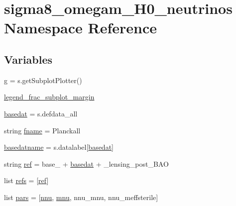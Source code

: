 \hypertarget{namespacesigma8__omegam__H0__neutrinos}{}\section{sigma8\+\_\+omegam\+\_\+\+H0\+\_\+neutrinos Namespace Reference}
\label{namespacesigma8__omegam__H0__neutrinos}
\subsection*{Variables}
\begin{DoxyCompactItemize}
\item 
\mbox{\hyperlink{namespacesigma8__omegam__H0__neutrinos_abdfd6f9ab8792b17acedacb69a00eb6a}{g}} = s.\+get\+Subplot\+Plotter()
\item 
\mbox{\hyperlink{namespacesigma8__omegam__H0__neutrinos_a851d0bb1a16b354468ede7ba521212b9}{legend\+\_\+frac\+\_\+subplot\+\_\+margin}}
\item 
\mbox{\hyperlink{namespacesigma8__omegam__H0__neutrinos_a2a6cd60f4f6be373ef9f1bee0d05e2f1}{basedat}} = s.\+defdata\+\_\+all
\item 
string \mbox{\hyperlink{namespacesigma8__omegam__H0__neutrinos_a232dec09313021ba3dac92f2bcaf6de0}{fname}} = \textquotesingle{}Planckall\textquotesingle{}
\item 
\mbox{\hyperlink{namespacesigma8__omegam__H0__neutrinos_ab81a53ce65e14fbd7fcebc8255bb9e24}{basedatname}} = s.\+datalabel\mbox{[}\mbox{\hyperlink{namespacesigma8__omegam__H0__neutrinos_a2a6cd60f4f6be373ef9f1bee0d05e2f1}{basedat}}\mbox{]}
\item 
string \mbox{\hyperlink{namespacesigma8__omegam__H0__neutrinos_a41d36fa1272490d649f360f5b530e386}{ref}} = \textquotesingle{}base\+\_\+\textquotesingle{} + \mbox{\hyperlink{namespacesigma8__omegam__H0__neutrinos_a2a6cd60f4f6be373ef9f1bee0d05e2f1}{basedat}} + \textquotesingle{}\+\_\+lensing\+\_\+post\+\_\+\+B\+AO\textquotesingle{}
\item 
list \mbox{\hyperlink{namespacesigma8__omegam__H0__neutrinos_a4470d44b4742518d7fce7f3ecf4c7a0e}{refs}} = \mbox{[}\mbox{\hyperlink{namespacesigma8__omegam__H0__neutrinos_a41d36fa1272490d649f360f5b530e386}{ref}}\mbox{]}
\item 
list \mbox{\hyperlink{namespacesigma8__omegam__H0__neutrinos_ade841c0749b57a989fcb15deaebc11b7}{pars}} = \mbox{[}\textquotesingle{}\mbox{\hyperlink{namespacesigma8__omegam__H0__neutrinos_acb935efeda9daade15f08c15a961ef21}{nnu}}\textquotesingle{}, \textquotesingle{}\mbox{\hyperlink{namespacesigma8__omegam__H0__neutrinos_af5508f23be264b167a81bc0ded5fef41}{mnu}}\textquotesingle{}, \textquotesingle{}nnu\+\_\+mnu\textquotesingle{}, \textquotesingle{}nnu\+\_\+meffsterile\textquotesingle{}\mbox{]}

\end{DoxyCompactItemize}
